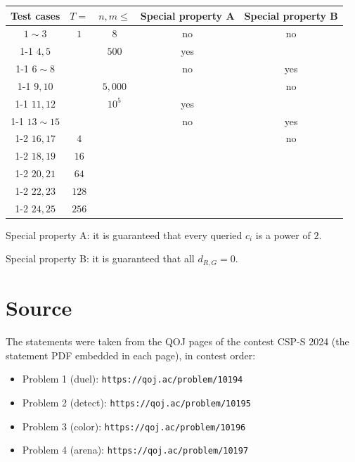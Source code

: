 \documentclass[11pt]{article}
\begin{document}
\begin{center}
\small
\begin{tabular}{|c|c|c|c|c|}
\hline
Test cases & $T =$ & $n, m \le$ & Special property A & Special property B \\
\hline
$1 \sim 3$ & $1$ & $8$ & no & no \\
\cline{1-1}\cline{3-4}
$4, 5$ & & $500$ & yes & \\
\cline{1-1}\cline{4-5}
$6 \sim 8$ & & & no & yes \\
\cline{1-1}\cline{3-3}\cline{5-5}
$9, 10$ & & $5{,}000$ & & no \\
\cline{1-1}\cline{3-4}
$11, 12$ & & $10^5$ & yes & \\
\cline{1-1}\cline{4-5}
$13 \sim 15$ & & & no & yes \\
\cline{1-2}\cline{5-5}
$16, 17$ & $4$ & & & no \\
\cline{1-2}
$18, 19$ & $16$ & & & \\
\cline{1-2}
$20, 21$ & $64$ & & & \\
\cline{1-2}
$22, 23$ & $128$ & & & \\
\cline{1-2}
$24, 25$ & $256$ & & & \\
\hline
\end{tabular}
\end{center}

Special property A: it is guaranteed that every queried $c_i$ is a power of
$2$.

Special property B: it is guaranteed that all $d_{R,G} = 0$.

\section*{Source}

The statements were taken from the QOJ pages of the contest CSP-S 2024
(the statement PDF embedded in each page), in contest order:
\begin{itemize}
\item Problem 1 (duel): \texttt{https://qoj.ac/problem/10194}
\item Problem 2 (detect): \texttt{https://qoj.ac/problem/10195}
\item Problem 3 (color): \texttt{https://qoj.ac/problem/10196}
\item Problem 4 (arena): \texttt{https://qoj.ac/problem/10197}
\end{itemize}
\end{document}
